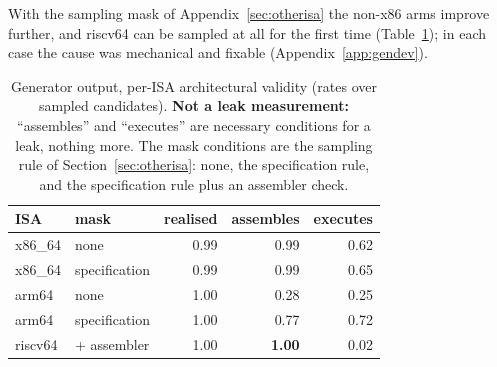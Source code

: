 \documentclass[conference]{IEEEtran}
\begin{document}
With the sampling mask of Appendix~\ref{sec:otherisa} the non-x86 arms improve
further, and riscv64 can be sampled at all for the first time
(Table~\ref{tab:isavalid}); in each case the cause was mechanical and fixable
(Appendix~\ref{app:gendev}).

\begin{table}[t]
\centering
\caption{Generator output, per-ISA architectural validity (rates over sampled
  candidates). \textbf{Not a leak measurement:} ``assembles'' and
  ``executes'' are necessary conditions for a leak, nothing more. The mask
  conditions are the sampling rule of Section~\ref{sec:otherisa}: none, the
  specification rule, and the specification rule plus an assembler check.}
\label{tab:isavalid}
\footnotesize
\setlength{\tabcolsep}{4pt}
\begin{tabular}{@{}llrrr@{}}
\toprule
ISA & mask & realised & assembles & executes \\
\midrule
x86\_64 & none          & 0.99 & 0.99 & 0.62 \\
x86\_64 & specification  & 0.99 & 0.99 & 0.65 \\
\addlinespace
arm64   & none          & 1.00 & 0.28 & 0.25 \\
arm64   & specification  & 1.00 & 0.77 & 0.72 \\
\addlinespace
riscv64 & + assembler    & 1.00 & \textbf{1.00} & 0.02 \\
\bottomrule
\end{tabular}
\end{table}
\end{document}
